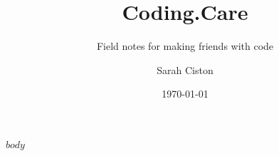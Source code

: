 \documentclass[10pt,twoside]{scrartcl}
\title{Coding.Care}
\subtitle{Field notes for making friends with code}
\author{Sarah Ciston}
\date{\today}
\begin{document}
\maketitle

\newpage

\renewcommand*\contentsname{Table of Contents}
\tableofcontents
\newpage

$body$
\end{document}
